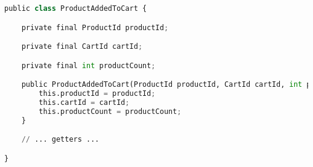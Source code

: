 \begin{lstlisting}[language=python]
public class ProductAddedToCart {

    private final ProductId productId;

    private final CartId cartId;

    private final int productCount;

    public ProductAddedToCart(ProductId productId, CartId cartId, int productCount) {
        this.productId = productId;
        this.cartId = cartId;
        this.productCount = productCount;
    }

    // ... getters ...

}
\end{lstlisting}